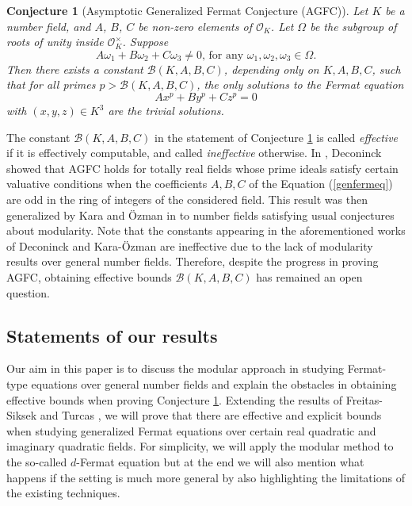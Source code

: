\documentclass[]{article}
\newtheorem{conjecture}{Conjecture}
\newcommand {\mcalO}{{\mathcal{O}}}
\begin{document}
\begin{conjecture}[Asymptotic Generalized Fermat Conjecture (AGFC)]\label{AGFC}
Let $K$ be a number field, and $A$, $B$, $C$ be non-zero elements of $\mcalO_K$. Let $\Omega$ be the subgroup of roots of unity inside $\mcalO_K^{\times}$. Suppose $$A\omega_1+B\omega_2+C\omega_3\neq0\text{,  for any $\omega_1,\omega_2,\omega_3\in\Omega$}.$$Then there exists a constant $\mathcal{B}(K,A,B,C)$, depending only on $K,A,B,C$, such that for all primes $p>\mathcal{B}(K,A,B,C)$, the only solutions to the Fermat equation $$Ax^p+By^p+Cz^p=0$$with $(x,y,z)\in K^3$ are the trivial solutions. 
\end{conjecture}

The constant $\mathcal{B}(K,A,B,C)$ in the statement of Conjecture \ref{AGFC} is called \textit{effective} if it is effectively computable, and called \textit{ineffective} otherwise. In \cite{deconinck2015generalized}, Deconinck showed that AGFC holds for totally real fields whose prime ideals satisfy certain valuative conditions when the coefficients $A,B,C$ of the Equation (\ref{genfermeq}) are odd in the ring of integers of the considered field. This result was then generalized by Kara and \"{O}zman in \cite{kara2020asymptotic} to number fields satisfying usual conjectures about modularity. Note that the constants appearing in the aforementioned works of Deconinck and Kara-\"{O}zman are ineffective due to the lack of modularity results over general number fields. Therefore, despite the progress in proving AGFC, obtaining effective bounds $\mathcal{B}(K,A,B,C)$ has remained an open question.

\subsection{Statements of our results}

Our aim in this paper is to discuss the modular approach in studying Fermat-type equations over general number fields and explain the obstacles in obtaining effective bounds when proving Conjecture \ref{AGFC}. Extending the results of Freitas-Siksek \cite{freitas2015fermat} and Turcas \cite{cturcacs2020serre}, we will prove that there are effective and explicit bounds when studying generalized Fermat equations over certain real quadratic and imaginary quadratic fields. For simplicity, we will apply the modular method to the so-called $d$-Fermat equation but at the end we will also mention what happens if the setting is much more general by also highlighting the limitations of the existing techniques. 
\end{document}
